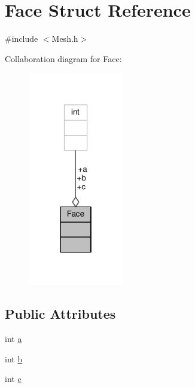 \hypertarget{structFace}{\section{Face Struct Reference}
\label{structFace}
}


{\ttfamily \#include $<$Mesh.\-h$>$}



Collaboration diagram for Face\-:
\nopagebreak
\begin{figure}[H]
\begin{center}
\leavevmode
\includegraphics[width=118pt]{structFace__coll__graph}
\end{center}
\end{figure}
\subsection*{Public Attributes}
\begin{DoxyCompactItemize}
\item 
int \hyperlink{structFace_ad22c1f9df64e0ab7301e3349840d374c}{a}
\item 
int \hyperlink{structFace_a7d790e4ef4951ecc9accf3112ca9b8ca}{b}
\item 
int \hyperlink{structFace_ada48793aa5b976dd136ace168499f624}{c}
\end{DoxyCompactItemize}



